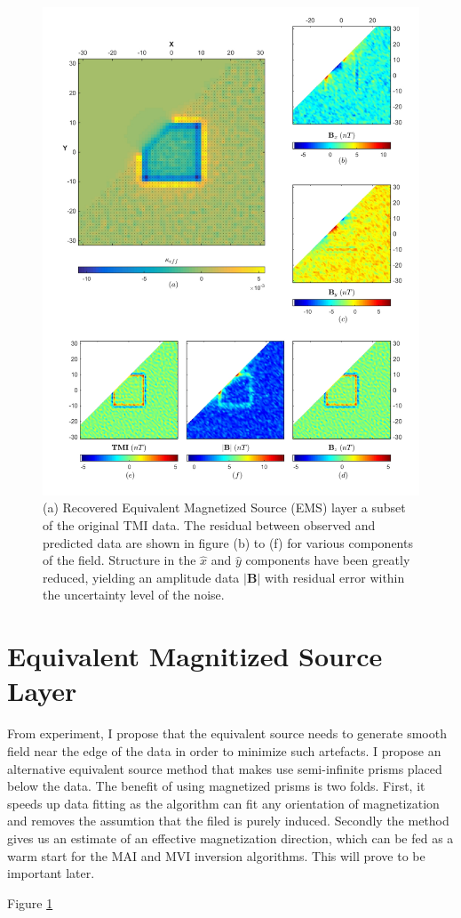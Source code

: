 \begin{figure}[h!]
\includegraphics[scale=0.60]{EMS_CornerOut}
\caption{(a) Recovered Equivalent Magnetized Source (EMS) layer a subset of the original TMI data. The residual between observed and predicted data are shown in figure (b) to (f) for various components of the field. Structure in the $\hat x$ and  $\hat y$ components have been greatly reduced, yielding an amplitude data $\mathbf{|B|}$ with residual error within the uncertainty level of the noise.}
\label{fig:EMS_CornerOut}
\end{figure}

\section{Equivalent Magnitized Source Layer}

From experiment, I propose that the equivalent source needs to generate smooth field near the edge of the data in order to minimize such artefacts.
I propose an alternative equivalent source method that makes use semi-infinite prisms placed below the data. 
The benefit of using magnetized prisms is two folds. First, it speeds up data fitting as the algorithm can fit any orientation of magnetization and removes the assumtion that the filed is purely induced.
Secondly the method gives us an estimate of an effective magnetization direction, which can be fed as a warm start for the MAI and MVI inversion algorithms. This will prove to be important later.

Figure \ref{fig:EMS_CornerOut}

\endinput

